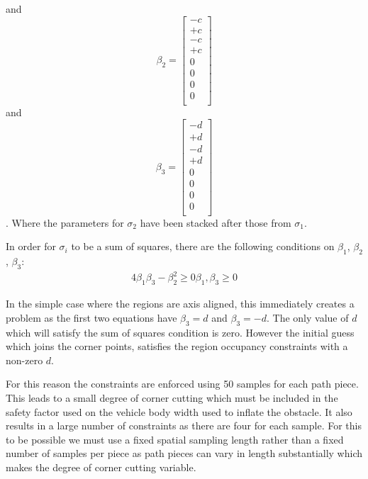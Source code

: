and
\begin{equation}
\beta_2 = \left[\begin{array}{c}
-c \\
+c  \\
-c \\
+c \\
0\\
0 \\
0 \\
0 \\
\end{array}\right]
\end{equation}
and
\begin{equation}
\beta_3 = \left[\begin{array}{c}
-d \\
+d  \\
-d \\
+d \\
0\\
0 \\
0 \\
0 \\
\end{array}\right]
\end{equation}
. Where the parameters for $\sigma_2$ have been stacked after those from $\sigma_1$. 

In order for $\sigma_i$ to be a sum of squares, there are the following conditions on $\beta_1$, $\beta_2$, $\beta_3$:
\begin{equation}
\begin{array}{c}
4\beta_1\beta_3 - \beta_2^2 \geq 0
\beta_1, \beta_3 \geq 0
\end{array}
\end{equation}

 In the simple case where the regions are axis aligned, this immediately creates a problem as the first two equations have $\beta_3 = d$ and $\beta_3 = -d$. The only value of $d$ which will satisfy the sum of squares condition is zero. However the initial guess which joins the corner points, satisfies the region occupancy constraints with a non-zero $d$. 
 
 For this reason the constraints are enforced using 50 samples for each path piece. This leads to a small degree of corner cutting which must be included in the safety factor used on the vehicle body width used to inflate the obstacle. It also results in a large number of constraints as there are four for each sample. For this to be possible we must use a fixed spatial sampling length rather than a fixed number of samples per piece as path pieces can vary in length substantially which makes the degree of corner cutting variable.
 



